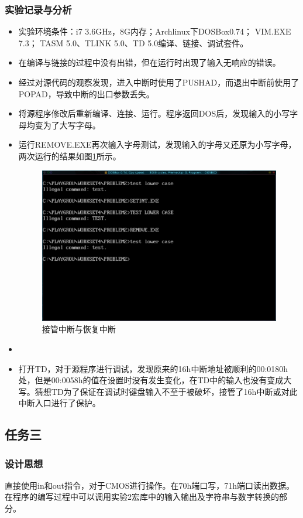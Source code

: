 \documentclass{article}
\begin{document}
	\subsubsection{实验记录与分析}
	\begin{itemize}
		\item 实验环境条件：i7 3.6GHz，8G内存；Archlinux下DOSBox0.74； VIM.EXE 7.3； TASM 5.0、TLINK 5.0、TD 5.0编译、链接、调试套件。
		\item 在编译与链接的过程中没有出错，但在运行时出现了输入无响应的错误。
		\item 经过对源代码的观察发现，进入中断时使用了PUSHAD，而退出中断前使用了POPAD，导致中断的出口参数丢失。
		\item 将源程序修改后重新编译、连接、运行。程序返回DOS后，发现输入的小写字母均变为了大写字母。
		\item 运行REMOVE.EXE再次输入字母测试，发现输入的字母又还原为小写字母，两次运行的结果如图\ref{fig:runint}所示。
			\begin{figure}[H]
				\centering
				\includegraphics[width=0.8\linewidth]{res/homework_4/runint.png}
				\caption{接管中断与恢复中断}
				\label{fig:runint}
			\end{figure}
		\item
		\item 打开TD，对于源程序进行调试，发现原来的16h中断地址被顺利的00:0180h处，但是00:0058h的值在设置时没有发生变化，在TD中的输入也没有变成大写。猜想TD为了保证在调试时键盘输入不至于被破坏，接管了16h中断或对此中断入口进行了保护。
	\end{itemize}

	\subsection{任务三}

	\subsubsection{设计思想}
	直接使用in和out指令，对于CMOS进行操作。在70h端口写，71h端口读出数据。在程序的编写过程中可以调用实验2宏库中的输入输出及字符串与数字转换的部分。
\end{document}
